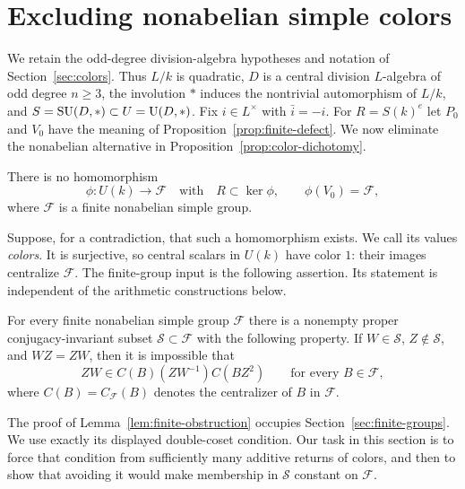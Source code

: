 \section{Excluding nonabelian simple colors}\label{sec:palettes}

We retain the odd-degree division-algebra hypotheses and notation of
Section~\ref{sec:colors}. Thus $L/k$ is quadratic, $D$ is a central division
$L$-algebra of odd degree $n\geq3$, the involution $*$ induces the nontrivial
automorphism of $L/k$, and $S=\operatorname{SU}(D,*)\subset U=\operatorname{U}(D,*)$.
Fix $i\in L^\times$ with $\bar i=-i$.
For $R=S(k)^e$ let $P_0$ and $V_0$ have the meaning of
Proposition~\ref{prop:finite-defect}. We now eliminate the nonabelian
alternative in Proposition~\ref{prop:color-dichotomy}.

\begin{theorem}\label{thm:no-simple-colors}
There is no homomorphism
\[
 \phi:U(k)\longrightarrow\mathcal F
 \quad\text{with}\quad
 R\subset\ker\phi,\qquad \phi(V_0)=\mathcal F,
\]
where $\mathcal F$ is a finite nonabelian simple group.
\end{theorem}

Suppose, for a contradiction, that such a homomorphism exists.
We call its values \emph{colors}. It is surjective, so central scalars in
$U(k)$ have color $1$: their images centralize $\mathcal F$.
The finite-group input is the following assertion. Its statement is
independent of the arithmetic constructions below.

\begin{lemma}\label{lem:finite-obstruction}
For every finite nonabelian simple group $\mathcal F$ there is a nonempty
proper conjugacy-invariant subset $\mathcal S\subset\mathcal F$ with the
following property. If $W\in\mathcal S$, $Z\notin\mathcal S$, and $WZ=ZW$,
then it is impossible that
\begin{equation}\label{eq:palette-obstruction}
 ZW\in C(B)(ZW^{-1})C(BZ^2)
 \qquad\text{for every }B\in\mathcal F,
\end{equation}
where $C(B)=C_{\mathcal F}(B)$ denotes the centralizer of $B$ in
$\mathcal F$.
\end{lemma}

The proof of Lemma~\ref{lem:finite-obstruction} occupies
Section~\ref{sec:finite-groups}. We use exactly its displayed
double-coset condition. Our task in this section is to force that condition
from sufficiently many additive returns of colors, and then to show that
avoiding it would make membership in $\mathcal S$ constant on
$\mathcal F$.

